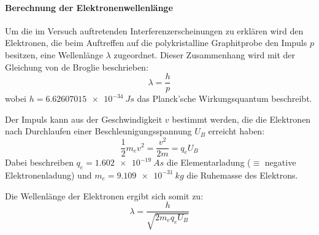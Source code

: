 \documentclass[ngerman]{scrartcl}
\begin{document}
\paragraph{Berechnung der Elektronenwellenlänge}
%
Um die im Versuch auftretenden Interferenzerscheinungen zu erklären wird den Elektronen, die beim Auftreffen auf die polykristalline Graphitprobe den Impuls $p$ besitzen, eine Wellenlänge $\lambda$ zugeordnet. Dieser Zusammenhang wird mit der Gleichung von de Broglie beschrieben:
%
\begin{equation}
    \label{eq:de_broglie}
    \lambda = \frac{h}{p}
\end{equation}
%
wobei $h=\SI{6.62607015e-34}{Js}$ das Planck'sche Wirkungsquantum beschreibt.

Der Impuls kann aus der Geschwindigkeit $v$ bestimmt werden, die die Elektronen nach Durchlaufen einer Beschleunigungsspannung $U_B$ erreicht haben:
%
\begin{equation}
    \label{eq:kinetische_energie}
    \frac{1}{2} m_e v^2 = \frac{v^2}{2 m} = q_e U_B
\end{equation}
%
Dabei beschreiben $q_e = \SI{1.602e-19}{As}$ die Elementarladung ($\equiv$ negative Elektronenladung) und $m_e = \SI{9.109e-31}{kg}$ die Ruhemasse des Elektrons.

Die Wellenlänge der Elektronen ergibt sich somit zu:
%
\begin{equation}
    \label{eq:wellenlaenge_elektronen}
    \lambda = \frac{h}{\sqrt{2 m_e q_e U_B}}
\end{equation}
\end{document}
